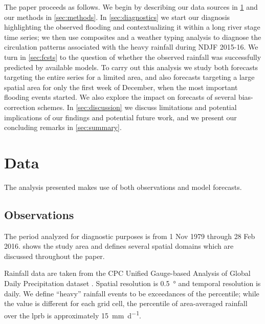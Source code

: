 \documentclass{ametsoc}
\begin{document}
The paper proceeds as follows.
We begin by describing our data sources in \cref{sec:data} and our methods in \cref{sec:methods}.
In \cref{sec:diagnostics} we start our diagnosis highlighting the observed flooding and contextualizing it within a long river stage time series; we then use composites and a weather typing analysis to diagnose the circulation patterns associated with the heavy rainfall during NDJF 2015-16.
We turn in \cref{sec:fcsts} to the question of whether the observed rainfall was successfully predicted by available models.
To carry out this analysis we study both forecasts targeting the entire series for a limited area, and also forecasts targeting a large spatial area for only the first week of December, when the most important flooding events started.
We also explore the impact on forecasts of several bias-correction schemes.
In \cref{sec:discussion} we discuss limitations and potential implications of our findings and potential future work, and we present our concluding remarks in \cref{sec:summary}.


\section{Data} \label{sec:data}

The analysis presented makes use of both observations and model forecasts.

\subsection{Observations}

The period analyzed for diagnostic purposes is from 1 Nov 1979 through 28 Feb 2016.
 shows the study area and defines several spatial domains which are discussed throughout the paper.

Rainfall data are taken from the CPC Unified Gauge-based Analysis of Global Daily Precipitation dataset \citep{Chen2008}.
Spatial resolution is \SI{0.5}{\degree} and temporal resolution is daily.
We define ``heavy'' rainfall events to be exceedances of the  percentile; while the value is different for each grid cell, the  percentile of area-averaged rainfall over the \gls{lprb} is approximately \SI{15}{\milli\meter\per\day}.
\end{document}
